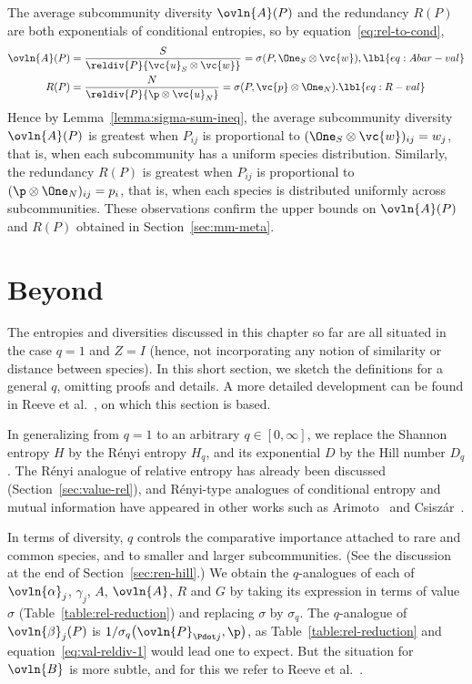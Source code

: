 The average subcommunity diversity $\ovln{A}(P)$ and the redundancy $R(P)$
are both exponentials of conditional entropies, so by
equation~\eqref{eq:rel-to-cond},
% 
\begin{align}
\index{value!alpha-diversity@and alpha-diversity}
\ovln{A}(P)     &
=
\frac{S}{\reldiv{P}{\vc{u}_S \otimes \vc{w}}}
=
\sigma(P, \One_S \otimes \vc{w}),       
\lbl{eq:Abar-val}       \\
\index{value!redundancy@and redundancy}
R(P)            &
=
\frac{N}{\reldiv{P}{\p \otimes \vc{u}_N}}
=
\sigma(P, \vc{p} \otimes \One_N).
\lbl{eq:R-val}
\end{align}
% 
Hence by Lemma~\ref{lemma:sigma-sum-ineq}, the average subcommunity
diversity $\ovln{A}(P)$ is greatest when $P_{ij}$ is proportional to
$(\One_S \otimes \vc{w})_{ij} = w_j$, that is, when each subcommunity has a
uniform species distribution. Similarly, the redundancy $R(P)$ is greatest
when $P_{ij}$ is proportional to $(\p \otimes \One_N)_{ij} = p_i$, that is,
when each species is distributed uniformly across subcommunities.  These
observations confirm the upper bounds on $\ovln{A}(P)$ and $R(P)$ obtained
in Section~\ref{sec:mm-meta}.



\section{Beyond}


The entropies and diversities discussed in this chapter so far are all
situated in the case $q = 1$ and $Z = I$ (hence, not incorporating any
notion of similarity or distance between species).  In this short section,
we sketch the definitions for a general $q$, omitting proofs and details.
A more detailed development can be found in Reeve et al.~\cite{HPD}, on
which this section is based.

In generalizing from $q = 1$ to an arbitrary $q \in [0, \infty]$, we
replace the Shannon entropy $H$ by the R\'enyi entropy $H_q$, and its
exponential $D$ by the Hill number $D_q$.  The R\'enyi analogue of relative
entropy has already been discussed (Section~\ref{sec:value-rel}), and
R\'enyi-type analogues of conditional entropy and mutual information have
appeared in other works such as Arimoto~\cite{Arim} and
Csisz\'ar~\cite{CsisGCR}.  

In terms of diversity, $q$ controls the comparative importance attached to
rare and common species, and to smaller and larger subcommunities.
(See the discussion at the end of Section~\ref{sec:ren-hill}.)  We
obtain the $q$-analogues%
%
%
% 
of each of $\ovln{\alpha}_j$, $\gamma_j$, $A$, $\ovln{A}$, $R$ and $G$ by
taking its expression in terms of value $\sigma$
(Table~\ref{table:rel-reduction}) and replacing $\sigma$ by $\sigma_q$.
The $q$-analogue of $\ovln{\beta}_j(P)$ is $1/\sigma_q\bigl(\ovln{P}_{\Pdot
  j}, \p\bigr)$, as Table~\ref{table:rel-reduction} and
equation~\eqref{eq:val-reldiv-1} would lead one to expect.  But the
situation for $\ovln{B}$ is more subtle, and for this we refer to Reeve et
al.~\cite{HPD}.

